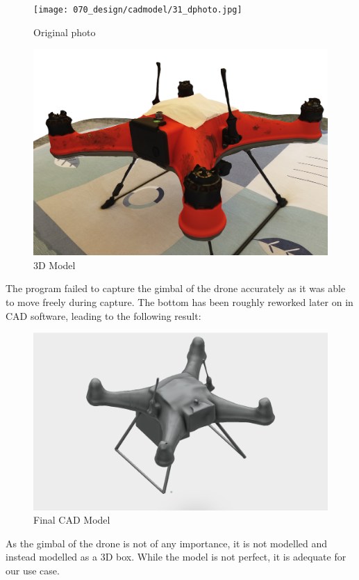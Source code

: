 \begin{figure}[h]
  \centering
  \begin{minipage}[b]{0.4\textwidth}
    \texttt{[image: 070\_design/cadmodel/31\_dphoto.jpg]}
    \caption{Original photo \cite{dronemodel}}
  \end{minipage}
  \hfill
  \begin{minipage}[b]{0.5\textwidth}
    \includegraphics[width=\textwidth]{070_design/cadmodel/32_dmodel.png}
    \caption{3D Model \cite{dronemodel}}
  \end{minipage}
\end{figure}

The program failed to capture the gimbal of the drone accurately as it was able to move freely during capture. The bottom has been roughly reworked later on in \gls{CAD} software, leading to the following result:

\begin{figure}[h]
\centering
\includegraphics[scale=0.1]{070_design/cadmodel/33_dcadmodel.png}
\caption{Final CAD Model \cite{dronemodel}}
\end{figure}

As the gimbal of the drone is not of any importance, it is not modelled and instead modelled as a \gls{3D} box. While the model is not perfect, it is adequate for our use case.

